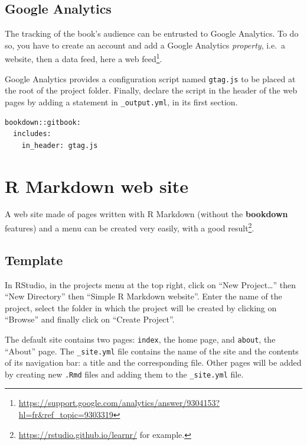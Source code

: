 \documentclass[
  12pt,
  american,
  a4paper,
  extrafontsizes,onecolumn,openright
  ]{memoir}
\begin{document}
\subsection{Google Analytics}\label{google-analytics}

The tracking of the book's audience can be entrusted to Google Analytics.
To do so, you have to create an account and add a Google Analytics \emph{property}, i.e.~a website, then a data feed, here a web feed\footnote{\url{https://support.google.com/analytics/answer/9304153?hl=fr&ref_topic=9303319}}.

Google Analytics provides a configuration script named \texttt{gtag.js} to be placed at the root of the project folder.
Finally, declare the script in the header of the web pages by adding a statement in \texttt{\_output.yml}, in its first section.

\begin{verbatim}
bookdown::gitbook:
  includes:
    in_header: gtag.js
\end{verbatim}

\section{R Markdown web site}\label{r-markdown-web-site}

A web site made of pages written with R Markdown (without the \textbf{bookdown} features) and a menu can be created very easily, with a good result\footnote{\url{https://rstudio.github.io/learnr/} for example.}.

\subsection{Template}\label{template}

In RStudio, in the projects menu at the top right, click on \enquote{New Project\ldots{}} then \enquote{New Directory} then \enquote{Simple R Markdown website}.
Enter the name of the project, select the folder in which the project will be created by clicking on \enquote{Browse} and finally click on \enquote{Create Project}.

The default site contains two pages: \texttt{index}, the home page, and \texttt{about}, the \enquote{About} page.
The \texttt{\_site.yml} file contains the name of the site and the contents of its navigation bar: a title and the corresponding file.
Other pages will be added by creating new \texttt{.Rmd} files and adding them to the \texttt{\_site.yml} file.
\end{document}
